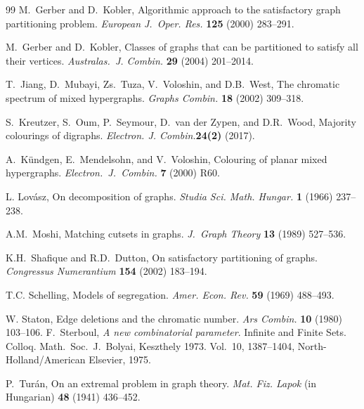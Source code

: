 \documentclass{article}
\theoremstyle{definition}
\begin{document}
\begin{thebibliography}{99}
M.\ Gerber and D.\ Kobler, Algorithmic approach to the satisfactory graph partitioning problem. \emph{European J.\ Oper. Res.} \textbf{125} (2000) 283--291.

M.\ Gerber and D.\ Kobler, Classes of graphs that can be partitioned to satisfy all their vertices. \emph{Australas.\ J. Combin.} \textbf{29} (2004) 201--2014.


 T.\ Jiang, D.\ Mubayi, Zs.\ Tuza, V.\ Voloshin, and D.B.\ West, The chromatic spectrum of mixed hypergraphs. \emph{Graphs Combin.} \textbf{18} (2002) 309--318.

 S.\ Kreutzer, S.\ Oum, P.\ Seymour, D.\ van der Zypen, and D.R.\ Wood, Majority colourings of digraphs. \emph{Electron. J. Combin.}\textbf{24(2)} (2017).

 
 A.\ K\"{u}ndgen, E.\ Mendelsohn, and V.\ Voloshin, Colouring of planar mixed hypergraphs. \emph{Electron.\ J.\ Combin.} \textbf{7} (2000) R60.  

 L. Lov\' asz, On decomposition of graphs. \emph{Studia Sci. Math. Hungar.} \textbf{1} (1966) 237--238.


A.M.\ Moshi, Matching cutsets in graphs. \emph{J.\ Graph Theory} \textbf{13} (1989) 527--536.

K.H.\ Shafique and R.D.\ Dutton, On satisfactory partitioning of graphs. \emph{Congressus Numerantium} \textbf{154} (2002) 183--194. 

 T.C. Schelling, Models of segregation. \emph{Amer. Econ. Rev.}
 \textbf{59} (1969) 488--493.

W. Staton, Edge deletions and the chromatic number.  \emph{Ars Combin.} \textbf{10} (1980) 103--106.
F.\ Sterboul,  \textit{A new combinatorial parameter}. Infinite and Finite Sets. Colloq.
Math.\ Soc.\ J.\ Bolyai, Keszthely 1973.  Vol.\ 10, 1387--1404, North-Holland/American Elsevier, 1975.

P.\ Tur\'{a}n, On an extremal problem in graph theory. \emph{Mat. Fiz. Lapok} (in Hungarian) \textbf{48} (1941) 436--452.


\end{thebibliography}
\end{document}
